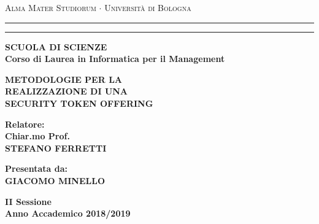 \documentclass[12pt,a4paper]{report}
\begin{document}
\begin{titlepage}
\begin{center}
{{\Large{\textsc{Alma Mater Studiorum $\cdot$ Universit\`a di
Bologna}}}} \rule[0.1cm]{15.8cm}{0.1mm}
\rule[0.5cm]{15.8cm}{0.6mm}
{\small{\bf SCUOLA DI SCIENZE\\
Corso di Laurea in Informatica per il Management }}
\end{center}
\vspace{15mm}
\begin{center}
{\LARGE{\bf METODOLOGIE PER LA}}\\
\vspace{3mm}
{\LARGE{\bf REALIZZAZIONE DI UNA}}\\
\vspace{3mm}
{\LARGE{\bf SECURITY TOKEN OFFERING}}\\
\end{center}
\vspace{40mm}
\par
\noindent
\begin{minipage}[t]{0.47\textwidth}
{\large{\bf Relatore:\\
Chiar.mo Prof.\\
STEFANO FERRETTI}}
\end{minipage}
\hfill
\begin{minipage}[t]{0.47\textwidth}\raggedleft
{\large{\bf Presentata da:\\
GIACOMO MINELLO}}
\end{minipage}
\vspace{20mm}
\begin{center}
{\large{\bf II Sessione\\%
Anno Accademico 2018/2019}}%
\end{center}
\end{titlepage}
\end{document}

